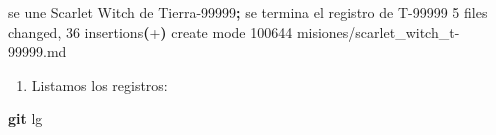 \documentclass[
]{book}
\newenvironment{Shaded}{\begin{snugshade}}{\end{snugshade}}
\newcommand{\ErrorTok}[1]{\textcolor[rgb]{0.64,0.00,0.00}{\textbf{#1}}}
\newcommand{\ExtensionTok}[1]{#1}
\newcommand{\FunctionTok}[1]{\textcolor[rgb]{0.13,0.29,0.53}{\textbf{#1}}}
\newcommand{\KeywordTok}[1]{\textcolor[rgb]{0.13,0.29,0.53}{\textbf{#1}}}
\newcommand{\NormalTok}[1]{#1}
\providecommand{\tightlist}{%
  \setlength{\itemsep}{0pt}\setlength{\parskip}{0pt}}
\begin{document}
\begin{Shaded}
\begin{Highlighting}[]
\ExtensionTok{[tierra{-}99999}\NormalTok{ f5907d1] se une Scarlet Witch de Tierra{-}99999}\KeywordTok{;} \ExtensionTok{se}\NormalTok{ termina el registro de T{-}99999}
 \ExtensionTok{5}\NormalTok{ files changed, 36 insertions}\ErrorTok{(}\ExtensionTok{+}\KeywordTok{)}
 \ExtensionTok{create}\NormalTok{ mode 100644 misiones/scarlet\_witch\_t{-}99999.md}
\end{Highlighting}
\end{Shaded}

\begin{enumerate}
\def\labelenumi{\arabic{enumi}.}
\setcounter{enumi}{7}
\tightlist
\item
  Listamos los registros:
\end{enumerate}

\begin{Shaded}
\begin{Highlighting}[]
\FunctionTok{git}\NormalTok{ lg}
\end{Highlighting}
\end{Shaded}
\end{document}
